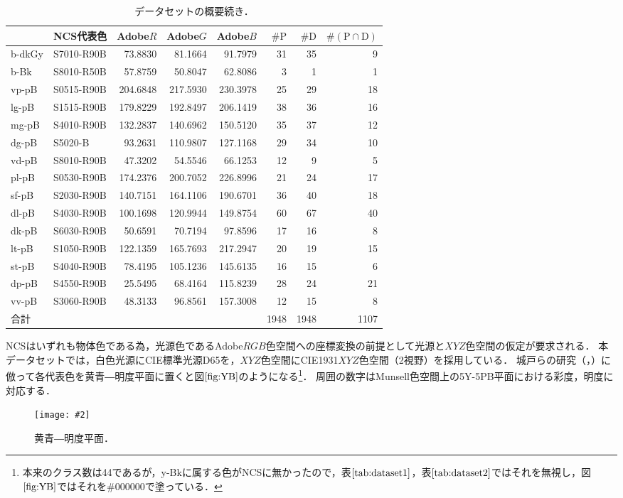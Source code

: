 \documentclass[uplatex,paper=a4,fontsize=4.0truemm,jafontsize=4.0truemm,head_space=30.0truemm,foot_space=30.0truemm,baselineskip=8.0truemm,line_length=40zw,gutter=25.0truemm,oneside,openany,fleqn,hanging_panctuation,open_bracket_pos=nibu_tentsuki,dvipdfmx,jis2004,book,titlepage]{jlreq}
\theoremstyle{mystyle}
\newcommand{\zwspace}{\hspace{1zw}\relax}
\newcommand{\captiondot}[1]{\caption{#1．}}
\newcommand{\figureinput}[4]{\begin{figure}[tbp]\centering\texttt{[image: \#2]}\captiondot{#3}\label{fig:#4}\end{figure}}
\newcommand{\tableinput}[4]{\begin{table}[tbp]\centering\captiondot{#3}\label{tab:#4}\begin{tabular}{#1}#2\end{tabular}\end{table}}
\newcommand{\mathdisplaystyle}[1]{\(\displaystyle{#1}\)}
\newcommand{\Reference}[1]{\mathdisplaystyle{\ref{#1}}}
\newcommand{\parentheses}[1]{\left(#1\right)}
\begin{document}
			\tableinput{l|lrrrrrr}{ & NCS代表色 & Adobe\(R\) & Adobe\(G\) & Adobe\(B\) & \(\#\textrm{P}\) & \(\#\textrm{D}\) & \(\#\parentheses{\text{P}\cap\text{D}}\) \\ \hline
				b-dkGy & S7010-R90B & 73.8830 & 81.1664 & 91.7979 & 31 & 35 & 9 \\
				b-Bk & S8010-R50B & 57.8759 & 50.8047 & 62.8086 & 3 & 1 & 1 \\
				vp-pB & S0515-R90B & 204.6848 & 217.5930 & 230.3978 & 25 & 29 & 18 \\
				lg-pB & S1515-R90B & 179.8229 & 192.8497 & 206.1419 & 38 & 36 & 16 \\
				mg-pB & S4010-R90B & 132.2837 & 140.6962 & 150.5120 & 35 & 37 & 12 \\
				dg-pB & S5020-B & 93.2631 & 110.9807 & 127.1168 & 29 & 34 & 10 \\
				vd-pB & S8010-R90B & 47.3202 & 54.5546 & 66.1253 & 12 & 9 & 5 \\
				pl-pB & S0530-R90B & 174.2376 & 200.7052 & 226.8996 & 21 & 24 & 17 \\
				sf-pB & S2030-R90B & 140.7151 & 164.1106 & 190.6701 & 36 & 40 & 18 \\
				dl-pB & S4030-R90B & 100.1698 & 120.9944 & 149.8754 & 60 & 67 & 40 \\
				dk-pB & S6030-R90B & 50.6591 & 70.7194 & 97.8596 & 17 & 16 & 8 \\
				lt-pB & S1050-R90B & 122.1359 & 165.7693 & 217.2947 & 20 & 19 & 15 \\
				st-pB & S4040-R90B & 78.4195 & 105.1236 & 145.6135 & 16 & 15 & 6 \\
				dp-pB & S4550-R90B & 25.5495 & 68.4164 & 115.8239 & 28 & 24 & 21 \\
				vv-pB & S3060-R90B & 48.3133 & 96.8561 & 157.3008 & 12 & 15 & 8 \\ \hline
				合計 &  &  &  &  & 1948 & 1948 & 1107}{データセットの概要\zwspace 続き}{dataset2}
			NCSはいずれも物体色である為，光源色であるAdobe\mathdisplaystyle{RGB}色空間への座標変換の前提として光源と\mathdisplaystyle{XYZ}色空間の仮定が要求される．
			本データセットでは，白色光源にCIE標準光源D65を，\mathdisplaystyle{XYZ}色空間にCIE1931\mathdisplaystyle{XYZ}色空間（2\textdegree 視野）\cite[pp.~28--30]{Yaguchi2017a}を採用している．
			城戸らの研究（\cite[図1]{Kido2017}，\cite[図1]{Kido2018}）に倣って各代表色を黄青―明度平面に置くと図\Reference{fig:YB}のようになる\footnote{本来のクラス数は44であるが，y-Bkに属する色がNCSに無かったので，表\Reference{tab:dataset1}，表\Reference{tab:dataset2}ではそれを無視し，図\Reference{fig:YB}ではそれを\#000000で塗っている．}．
			周囲の数字はMunsell色空間上の5Y-5PB平面における彩度，明度に対応する．
			\figureinput{width=\linewidth}{D:/a/figs/YB.png}{黄青―明度平面}{YB}
\end{document}
